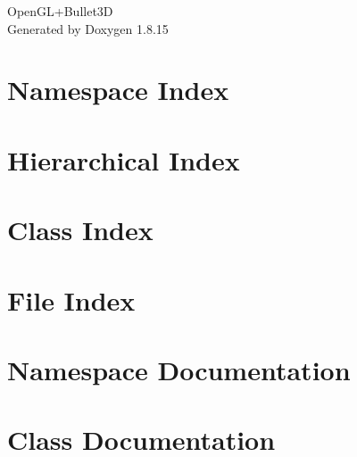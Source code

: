 \let\mypdfximage\pdfximage\def\pdfximage{\immediate\mypdfximage}\documentclass[twoside]{book}
\newcommand{\+}{\discretionary{\mbox{\scriptsize$\hookleftarrow$}}{}{}}
\newcommand{\clearemptydoublepage}{%
  \newpage{\pagestyle{empty}\cleardoublepage}%
}
\begin{document}
\begin{titlepage}
\vspace*{7cm}
\begin{center}%
{\Large Open\+G\+L+\+Bullet3D }\\
\vspace*{1cm}
{\large Generated by Doxygen 1.8.15}\\
\end{center}
\end{titlepage}
\clearemptydoublepage
{}
\tableofcontents
\clearemptydoublepage
{}

\chapter{Namespace Index}

\chapter{Hierarchical Index}

\chapter{Class Index}

\chapter{File Index}

\chapter{Namespace Documentation}


\chapter{Class Documentation}






















\end{document}
